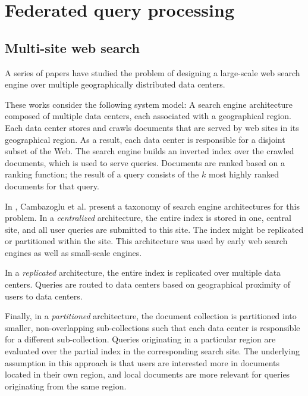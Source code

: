 \section{Federated query processing}
\label{sec:federation}
\subsection{Multi-site web search}
A series of papers \cite{cambazoglu:multisitequantifying, yates:multisitefeasibility, cambazoglu:multisiteforwarding, frances:multisiteefficiency, kayaaslan:multisitereplication}
have studied the problem of designing a large-scale web search engine over multiple geographically distributed data centers.

These works consider the following system model:
A search engine architecture composed of multiple data centers, each associated with a geographical region.
Each data center stores and crawls documents that are served by web sites in its geographical region.
As a result, each data center is responsible for a disjoint subset of the Web.
The search engine builds an inverted index over the crawled documents, which is used to serve queries.
Documents are ranked based on a ranking function; the result of a query consists of the $k$ most highly ranked documents
for that query.

\bigskip
\noindent
In \cite{cambazoglu:multisitequantifying}, Cambazoglu et al. present a taxonomy of search engine architectures for this problem.
In a \textit{centralized} architecture, the entire index is stored in one, central site, and all user queries are submitted to this site.
The index might be replicated or partitioned within the site.
This architecture was used by early web search engines as well as small-scale engines.

In a \textit{replicated} architecture, the entire index is replicated over multiple data centers.
Queries are routed to data centers based on geographical proximity of users to data centers.

Finally, in a \textit{partitioned} architecture, the document collection is partitioned into smaller, non-overlapping
sub-collections such that each data center is responsible for a different sub-collection.
Queries originating in a particular region are evaluated over the partial index in the corresponding search site.
The underlying assumption in this approach is that users are interested more in documents located in their own region,
and local documents are more relevant for queries originating from the same region.

